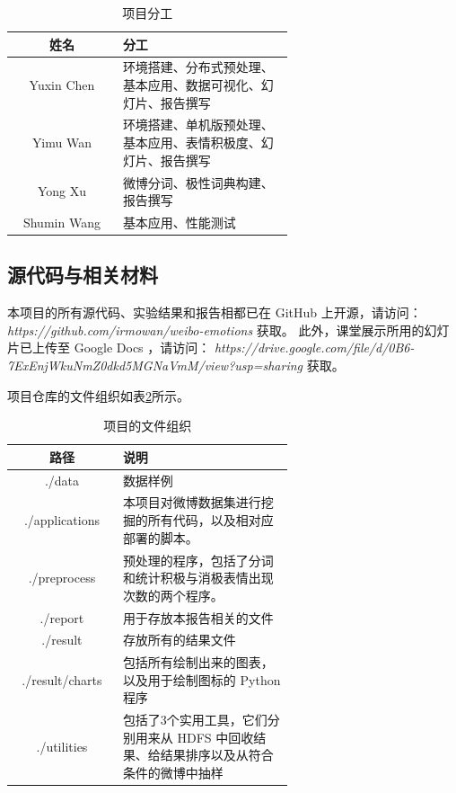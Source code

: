 \documentclass[12pt, oneside]{article}
\begin{document}
\begin{spacing}{1.5}
\begin{CJK}{UTF8}{gbsn}
\begin{table}[]
\centering
\begin{tabular}{|c|p{0.618\linewidth}|}
\hline
姓名          & 分工                              \\ \hline
Yuxin Chen  & 环境搭建、分布式预处理、基本应用、数据可视化、幻灯片、报告撰写 \\ \hline
Yimu Wan    & 环境搭建、单机版预处理、基本应用、表情积极度、幻灯片、报告撰写     \\ \hline
Yong Xu     & 微博分词、极性词典构建、报告撰写                   \\ \hline
Shumin Wang & 基本应用、性能测试                         \\ \hline
\end{tabular}
\caption{项目分工}
\label{tbl:responsibilities}
\end{table}

\subsection{源代码与相关材料}
本项目的所有源代码、实验结果和报告相都已在 GitHub 上开源，请访问： {\it https://github.com/irmowan/weibo-emotions} 获取。
此外，课堂展示所用的幻灯片已上传至 Google Docs ，请访问： {\it https://drive.google.com/file/d/0B6-7ExEnjWkuNmZ0dkd5MGNaVmM/view?usp=sharing} 获取。

项目仓库的文件组织如表\ref{tbl:files_organization}所示。
\begin{table}[]
\centering
\begin{tabular}{|c|p{0.618\linewidth}|}
\hline
路径              & 说明                               \\ \hline
./data	   &  数据样例			\\ \hline
./applications  & 本项目对微博数据集进行挖掘的所有代码，以及相对应部署的脚本。    \\ \hline
./preprocess    & 预处理的程序，包括了分词和统计积极与消极表情出现次数的两个程序。 \\ \hline
./report        & 用于存放本报告相关的文件                     \\ \hline
./result        & 存放所有的结果文件                        \\ \hline
./result/charts & 包括所有绘制出来的图表，以及用于绘制图标的 Python 程序    \\ \hline
./utilities     & 包括了3个实用工具，它们分别用来从 HDFS 中回收结果、给结果排序以及从符合条件的微博中抽样        \\ \hline
\end{tabular}
\caption{项目的文件组织}
\label{tbl:files_organization}
\end{table}


\end{CJK}
\end{spacing}
\end{document}
